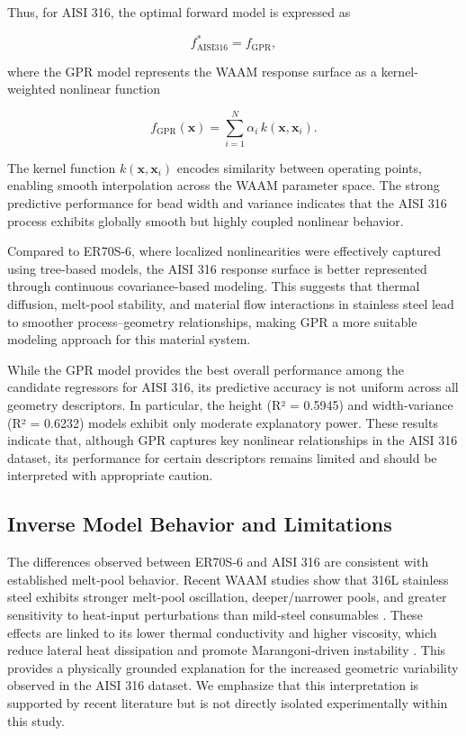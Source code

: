 \documentclass[11pt]{article}
\begin{document}
Thus, for AISI 316, the optimal forward model is expressed as

\begin{equation}
f_{\mathrm{AISI316}}^{*} = f_{\mathrm{GPR}},
\end{equation}

where the GPR model represents the WAAM response surface as a kernel-weighted nonlinear function

\begin{equation}
f_{\mathrm{GPR}}(\mathbf{x}) =
\sum_{i=1}^{N}
\alpha_i \, k(\mathbf{x},\mathbf{x}_i).
\end{equation}

The kernel function $k(\mathbf{x},\mathbf{x}_i)$ encodes similarity between operating points, enabling smooth interpolation across the WAAM parameter space. The strong predictive performance for bead width and variance indicates that the AISI 316 process exhibits globally smooth but highly coupled nonlinear behavior.

Compared to ER70S-6, where localized nonlinearities were effectively captured using tree-based models, the AISI 316 response surface is better represented through continuous covariance-based modeling. This suggests that thermal diffusion, melt-pool stability, and material flow interactions in stainless steel lead to smoother process--geometry relationships, making GPR a more suitable modeling approach for this material system.

While the GPR model provides the best overall performance among the candidate regressors for AISI 316, its predictive accuracy is not uniform across all geometry descriptors. In particular, the height (R² = 0.5945) and width‑variance (R² = 0.6232) models exhibit only moderate explanatory power. These results indicate that, although GPR captures key nonlinear relationships in the AISI 316 dataset, its performance for certain descriptors remains limited and should be interpreted with appropriate caution.

\subsection{Inverse Model Behavior and Limitations}

The differences observed between ER70S‑6 and AISI 316 are consistent with established melt‑pool behavior. Recent WAAM studies show that 316L stainless steel exhibits stronger melt‑pool oscillation, deeper/narrower pools, and greater sensitivity to heat‑input perturbations than mild‑steel consumables \cite{Zhang2021MeltPoolDynamics,Ding2019WAAM316L}. These effects are linked to its lower thermal conductivity and higher viscosity, which reduce lateral heat dissipation and promote Marangoni‑driven instability \cite{Mills2019Thermophysical,Zhao2020Marangoni,Li2022ThermalTransport}. This provides a physically grounded explanation for the increased geometric variability observed in the AISI 316 dataset. We emphasize that this interpretation is supported by recent literature but is not directly isolated experimentally within this study.
\end{document}
